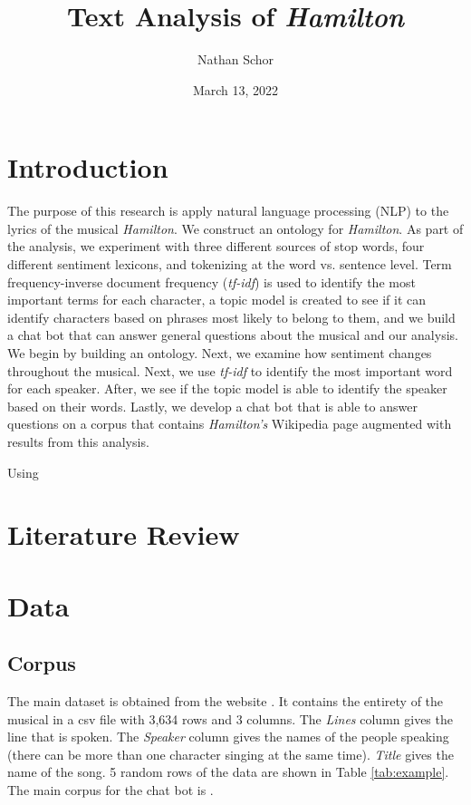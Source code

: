 \documentclass{article}
\title{Text Analysis of \emph{Hamilton}}
\author{Nathan Schor}
\date{March 13, 2022}
\begin{document}
\maketitle
\begin{singlespace}
\tableofcontents
\end{singlespace}

\section{Introduction}

The purpose of this research is apply natural language processing (NLP) to the lyrics of the musical \emph{Hamilton}. We construct an ontology for \emph{Hamilton}. As part of the analysis, we experiment with three different sources of stop words, four different sentiment lexicons, and tokenizing at the word vs. sentence level. Term frequency-inverse document frequency (\emph{tf-idf}) is used to identify the most important terms for each character, a topic model is created to see if it can identify characters based on phrases most likely to belong to them, and we build a chat bot that can answer general questions about the musical and our analysis. We begin by building an ontology. Next, we examine how sentiment changes throughout the musical. Next, we use \emph{tf-idf} to identify the most important word for each speaker. After, we see if the topic model is able to identify the speaker based on their words. Lastly, we develop a chat bot that is able to answer questions on a corpus that contains \emph{Hamilton's} Wikipedia page augmented with results from this analysis. 

Using \cite{Silge2022}




\section{Literature Review}

\section{Data}

\subsection{Corpus}

The main dataset is obtained from the website \cite{Kaggle2019}. It contains the entirety of the musical in a csv file with 3,634 rows and 3 columns. The \emph{Lines} column gives the line that is spoken. The \emph{Speaker} column gives the names of the people speaking (there can be more than one character singing at the same time). \emph{Title} gives the name of the song. 5 random rows of the data are shown in Table \ref{tab:example}. The main corpus for the chat bot is \cite{Wiki}.
\end{document}
